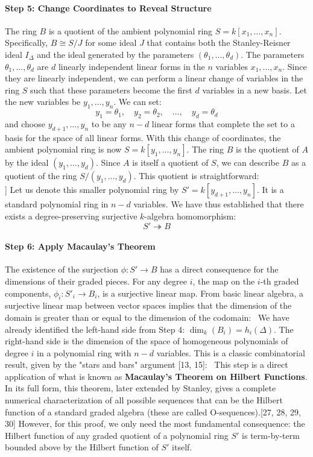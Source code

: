 \documentclass[11pt]{article}
\begin{document}
\paragraph{Step 5: Change Coordinates to Reveal Structure}
The ring $B$ is a quotient of the ambient polynomial ring $S = k[x_1, \ldots, x_n]$. Specifically, $B \cong S / J$ for some ideal $J$ that contains both the Stanley-Reisner ideal $I_\Delta$ and the ideal generated by the parameters $(\theta_1, \ldots, \theta_d)$.
The parameters $\theta_1, \ldots, \theta_d$ are $d$ linearly independent linear forms in the $n$ variables $x_1, \ldots, x_n$. Since they are linearly independent, we can perform a linear change of variables in the ring $S$ such that these parameters become the first $d$ variables in a new basis. Let the new variables be $y_1, \ldots, y_n$. We can set:
\[y_1 = \theta_1, \quad y_2 = \theta_2, \quad \ldots, \quad y_d = \theta_d\]
and choose $y_{d+1}, \ldots, y_n$ to be any $n-d$ linear forms that complete the set to a basis for the space of all linear forms.
With this change of coordinates, the ambient polynomial ring is now $S = k[y_1, \ldots, y_n]$. The ring $B$ is the quotient of $A$ by the ideal $(y_1, \ldots, y_d)$. Since $A$ is itself a quotient of $S$, we can describe $B$ as a quotient of the ring $S / (y_1, \ldots, y_d)$. This quotient is straightforward:
\\]
Let us denote this smaller polynomial ring by $S' = k[y_{d+1}, \ldots, y_n]$. It is a standard polynomial ring in $n-d$ variables. We have thus established that there exists a degree-preserving surjective $k$-algebra homomorphism:
\[
S' \twoheadrightarrow B
\]

\paragraph{Step 6: Apply Macaulay's Theorem}
The existence of the surjection $\phi: S' \to B$ has a direct consequence for the dimensions of their graded pieces. For any degree $i$, the map on the $i$-th graded components, $\phi_i: S'_i \to B_i$, is a surjective linear map.
From basic linear algebra, a surjective linear map between vector spaces implies that the dimension of the domain is greater than or equal to the dimension of the codomain:
\
We have already identified the left-hand side from Step 4: $\dim_k(B_i) = h_i(\Delta)$.
The right-hand side is the dimension of the space of homogeneous polynomials of degree $i$ in a polynomial ring with $n-d$ variables. This is a classic combinatorial result, given by the "stars and bars" argument [13, 15]:
\
This step is a direct application of what is known as \textbf{Macaulay's Theorem on Hilbert Functions}. In its full form, this theorem, later extended by Stanley, gives a complete numerical characterization of all possible sequences that can be the Hilbert function of a standard graded algebra (these are called O-sequences).[27, 28, 29, 30] However, for this proof, we only need the most fundamental consequence: the Hilbert function of any graded quotient of a polynomial ring $S'$ is term-by-term bounded above by the Hilbert function of $S'$ itself.
\end{document}
